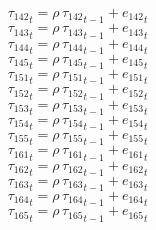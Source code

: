 \begin{dmath}
{{\tau_{142}}}_{t}={{\rho}}\, {{\tau_{142}}}_{t-1}+{{e_{142}}}_{t}
\end{dmath}
\begin{dmath}
{{\tau_{143}}}_{t}={{\rho}}\, {{\tau_{143}}}_{t-1}+{{e_{143}}}_{t}
\end{dmath}
\begin{dmath}
{{\tau_{144}}}_{t}={{\rho}}\, {{\tau_{144}}}_{t-1}+{{e_{144}}}_{t}
\end{dmath}
\begin{dmath}
{{\tau_{145}}}_{t}={{\rho}}\, {{\tau_{145}}}_{t-1}+{{e_{145}}}_{t}
\end{dmath}
\begin{dmath}
{{\tau_{151}}}_{t}={{\rho}}\, {{\tau_{151}}}_{t-1}+{{e_{151}}}_{t}
\end{dmath}
\begin{dmath}
{{\tau_{152}}}_{t}={{\rho}}\, {{\tau_{152}}}_{t-1}+{{e_{152}}}_{t}
\end{dmath}
\begin{dmath}
{{\tau_{153}}}_{t}={{\rho}}\, {{\tau_{153}}}_{t-1}+{{e_{153}}}_{t}
\end{dmath}
\begin{dmath}
{{\tau_{154}}}_{t}={{\rho}}\, {{\tau_{154}}}_{t-1}+{{e_{154}}}_{t}
\end{dmath}
\begin{dmath}
{{\tau_{155}}}_{t}={{\rho}}\, {{\tau_{155}}}_{t-1}+{{e_{155}}}_{t}
\end{dmath}
\begin{dmath}
{{\tau_{161}}}_{t}={{\rho}}\, {{\tau_{161}}}_{t-1}+{{e_{161}}}_{t}
\end{dmath}
\begin{dmath}
{{\tau_{162}}}_{t}={{\rho}}\, {{\tau_{162}}}_{t-1}+{{e_{162}}}_{t}
\end{dmath}
\begin{dmath}
{{\tau_{163}}}_{t}={{\rho}}\, {{\tau_{163}}}_{t-1}+{{e_{163}}}_{t}
\end{dmath}
\begin{dmath}
{{\tau_{164}}}_{t}={{\rho}}\, {{\tau_{164}}}_{t-1}+{{e_{164}}}_{t}
\end{dmath}
\begin{dmath}
{{\tau_{165}}}_{t}={{\rho}}\, {{\tau_{165}}}_{t-1}+{{e_{165}}}_{t}
\end{dmath}

